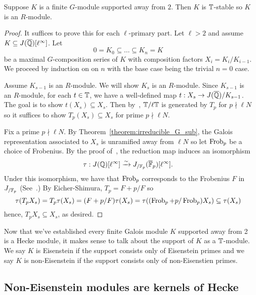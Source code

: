 \documentclass{article}
\begin{document}
\begin{theorem}\label{theorem:G_modules_are_Hecke}
    Suppose $K$ is a finite $G$-module supported away from $2$. Then $K$ is
    $\mathbb{T}$-stable so $K$ is an $R$-module.
\end{theorem}
\begin{proof}
    It suffices to prove this for each $\ell$-primary part. Let $\ell>2$ and
    assume $K\subseteq J(\overline{\mathbb{Q}})[\ell^\infty]$. Let
    \[
        0 = K_0 \subseteq \ldots \subseteq K_n = K
    \]
    be a maximal $G$-composition series of $K$ with composition factors $X_i =
    K_i/K_{i-1}$. We proceed by induction on on $n$ with the base
    case being the trivial $n=0$ case. 
    
    Assume $K_{s-1}$ is an $R$-module. We will show $K_s$ is an $R$-module.
    Since $K_{s-1}$ is an $R$-module, for each $t\in \mathbb{T}$, we have a
    well-defined map $t:X_s\to J(\overline{\mathbb{Q}})/K_{s-1}$. The goal is to show
    $t(X_s)\subseteq X_s$. Then by~\cite[Prop. 6.1]{MR1610883}, $\mathbb{T}/\ell \mathbb{T}$
    is generated by $T_p$ for $p\nmid \ell N$ so it suffices to show
    $T_p(X_s)\subseteq X_s$ for prime $p\nmid \ell N$.

    Fix a prime $p\nmid \ell N$. By Theorem~\ref{theorem:irreducible_G_sub},
    the Galois representation associated to $X_s$ is unramified away from $\ell
    N$ so let $\operatorname{Frob}_p$ be a choice of Frobenius. By the proof of~\cite[Lemma
    12.6.2]{ribet-stein:mod}, the reduction map induces an isomorphism
    \[
        \tau:J(\mathbb{Q})[\ell^\infty] \xrightarrow{\sim} J_{/\mathbb{F}_p} (\overline{\mathbb{F}}_p)[\ell^\infty].
    \]
    Under this isomorphism, we have that $\operatorname{Frob}_p$ corresponds to the Frobenius
    $F$ in $J_{/\mathbb{F}_p}$ (See~\cite[\S 5.3]{ribet-stein:serre}.) By
    Eicher-Shimura, $T_p = F+p/F$ so
    \[
    \tau(T_p X_s) 
    = T_p\tau(X_s) 
    = (F+p/F)\tau(X_s)
    = \tau((\operatorname{Frob}_p+p/\operatorname{Frob}_p)X_s)
    \subseteq \tau(X_s)
    \]
    hence, $T_p X_s\subseteq X_s$, as desired.
\end{proof}

Now that we've established every finite Galois module $K$ supported away from 2
is a Hecke module, it makes sense to talk about the support of $K$ as a
$\mathbb{T}$-module. We say $K$ is Eisenstein if the support consists only of
Eisenstein primes and we say $K$ is non-Eisenstein if the support consists
only of non-Eisenstien primes.


\subsection{Non-Eisenstein modules are kernels of Hecke}%
\label{sub:non_eisenstein_modules_are_kernels_of_hecke}
\end{document}
